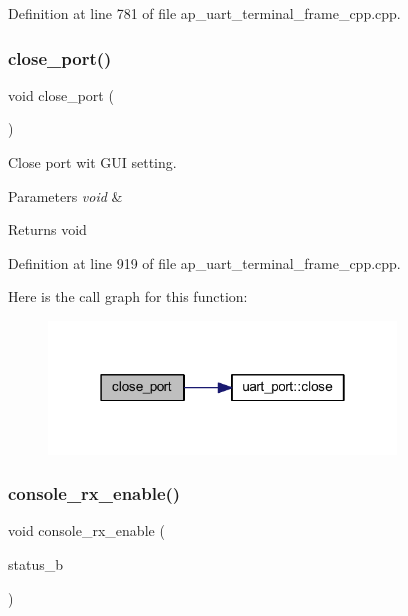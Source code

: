 Definition at line 781 of file ap\+\_\+uart\+\_\+terminal\+\_\+frame\+\_\+cpp.\+cpp.

\mbox{\label{group___u_a_r_t__terminal_ga39ec9a45c5fdf3b61ef3ca88973bc07c}} 
\subsubsection{close\_port()}
{\footnotesize\ttfamily void close\+\_\+port (\begin{DoxyParamCaption}\item[{void}]{ }\end{DoxyParamCaption})}



Close port wit G\+UI setting. 


\begin{DoxyParams}{Parameters}
{\em void} & \\
\hline
\end{DoxyParams}
\begin{DoxyReturn}{Returns}
void 
\end{DoxyReturn}


Definition at line 919 of file ap\+\_\+uart\+\_\+terminal\+\_\+frame\+\_\+cpp.\+cpp.

Here is the call graph for this function\+:
\nopagebreak
\begin{figure}[H]
\begin{center}
\leavevmode
\includegraphics[width=262pt]{group___u_a_r_t__terminal_ga39ec9a45c5fdf3b61ef3ca88973bc07c_cgraph}
\end{center}
\end{figure}
\mbox{\label{group___u_a_r_t__terminal_ga5ae97e580d2959af3a39e0bbc58bd18f}} 
\subsubsection{console\_rx\_enable()}
{\footnotesize\ttfamily void console\+\_\+rx\+\_\+enable (\begin{DoxyParamCaption}\item[{bool}]{status\+\_\+b }\end{DoxyParamCaption})}



